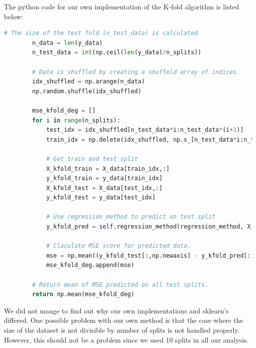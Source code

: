 The python code for our own implementation of the K-fold algorithm is listed
below: 
\begin{lstlisting}[language=Python]
        # The size of the test fold (n_test_data) is calculated 
        n_data = len(y_data)
        n_test_data = int(np.ceil(len(y_data)/n_splits))

        # Data is shuffled by creating a shuffeld array of indices.   
        idx_shuffled = np.arange(n_data)
        np.random.shuffle(idx_shuffled)

        mse_kfold_deg = []
        for i in range(n_splits): 
            test_idx = idx_shuffled[n_test_data*i:n_test_data*(i+1)]
            train_idx = np.delete(idx_shuffled, np.s_[n_test_data*i:n_test_data*(i+1)])

            # Get train and test split
            X_kfold_train = X_data[train_idx,:]
            y_kfold_train = y_data[train_idx]
            X_kfold_test = X_data[test_idx,:]
            y_kfold_test = y_data[test_idx]

            # Use regression_method to predict on test split 
            y_kfold_pred = self.regression_method(regression_method, X_kfold_train, y_kfold_train, X_kfold_test, lamb = self.lamb)

            # Claculate MSE score for predicted data. 
            mse = np.mean((y_kfold_test[:,np.newaxis] - y_kfold_pred[:,np.newaxis])**2) 
            mse_kfold_deg.append(mse)

        # Return mean of MSE predicted on all test splits.  
        return np.mean(mse_kfold_deg)
\end{lstlisting}
We did not mange to find out why our own implementations and sklearn's differed.
One possible problem with our own method is that the case where the size of the
dataset is not divisible by number of splits is not handled properly. However, this
should not be a problem since we used 10 splits in all our analysis. 








